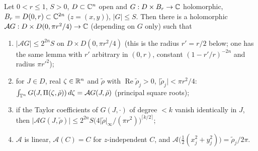 \begin{lemma}\label{bpP:p11:polar-avg}
Let $0<r\le1$, $S>0$, $D\subset\mathbb{C}^n$ open and $G:D\times B_r\to\mathbb{C}$ holomorphic, $B_r=D(0,r)\subset\mathbb{C}^{2n}$ ($z=(x,y)$), $\lvert G\rvert\le S$. Then there is a holomorphic $\mathcal AG:D\times D(0,\pi r^2/4)\to\mathbb{C}$ (depending on $G$ only) such that
\begin{enumerate}[label=(\alph*)]
\item $\lvert\mathcal AG\rvert\le2^{2n}S$ on $D\times D(0,\pi r^2/4)$ (this is the radius $r'=r/2$ below; one has the same lemma with $r'$ arbitrary in $(0,r)$, constant $(1-r'/r)^{-2n}$ and radius $\pi r'^2$);
\item for $J\in D$, real $\zeta\in\mathbb{R}^n$ and $\tilde\rho$ with $\operatorname{Re}\tilde\rho_j>0$, $\lvert\tilde\rho_j\rvert<\pi r^2/4$: $\int_{\mathbb{T}^n}G(J,\Pi(\zeta,\tilde\rho))\,d\zeta=\mathcal AG(J,\tilde\rho)$ (principal square roots);
\item if the Taylor coefficients of $G(J,\cdot)$ of degree $<k$ vanish identically in $J$, then $\lvert\mathcal AG(J,\tilde\rho)\rvert\le2^{2n}S\bigl(4\lvert\tilde\rho\rvert_\infty/(\pi r^2)\bigr)^{\lceil k/2\rceil}$;
\item $\mathcal A$ is linear, $\mathcal A(C)=C$ for $z$-independent $C$, and $\mathcal A\bigl(\tfrac12(x_j^2+y_j^2)\bigr)=\tilde\rho_j/2\pi$.
\end{enumerate}
\end{lemma}
